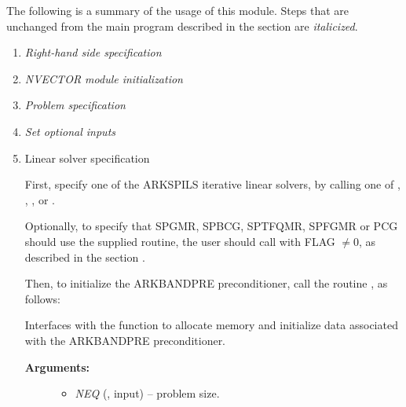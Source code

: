 \documentclass[letterpaper,10pt,english]{sphinxmanual}
\begin{document}
The following is a summary of the usage of this module.  Steps that
are unchanged from the main program described in the section
{\hyperref[f_interface/Usage:finterface-usage]{\emph{}}} are \emph{italicized}.
\begin{enumerate}
\item {} 
\emph{Right-hand side specification}

\item {} 
\emph{NVECTOR module initialization}

\item {} 
\emph{Problem specification}

\item {} 
\emph{Set optional inputs}

\item {} 
Linear solver specification

First, specify one of the ARKSPILS iterative linear solvers, by
calling one of {\hyperref[f_interface/Usage:f/_/FARKSPGMR]{\emph{}}}, {\hyperref[f_interface/Usage:f/_/FARKSPBCG]{\emph{}}},
{\hyperref[f_interface/Usage:f/_/FARKSPTFQMR]{\emph{}}}, {\hyperref[f_interface/Usage:f/_/FARKSPFGMR]{\emph{}}} or
{\hyperref[f_interface/Usage:f/_/FARKPCG]{\emph{}}}.

Optionally, to specify that SPGMR, SPBCG, SPTFQMR, SPFGMR or PCG
should use the supplied {\hyperref[f_interface/Usage:f/_/FARKJTIMES]{\emph{}}} routine, the user
should call {\hyperref[f_interface/Usage:f/_/FARKSPILSSETJAC]{\emph{}}} with FLAG \(\ne 0\),
as described in the section {\hyperref[f_interface/Usage:finterface-spilsusersupplied]{\emph{}}}.

Then, to initialize the ARKBANDPRE preconditioner, call the
routine {\hyperref[f_interface/Preconditioning:f/_/FARKBPINIT]{\emph{}}}, as follows:

\begin{fulllineitems}
\label{f_interface/Preconditioning:f/_/FARKBPINIT}
Interfaces with the {\hyperref[c_interface/Preconditioners:c.ARKBandPrecInit]{\emph{}}}
function to allocate memory and initialize data associated
with the ARKBANDPRE preconditioner.
\begin{description}
\item[{\textbf{Arguments:}}] \leavevmode\begin{itemize}
\item {} 
\emph{NEQ} (, input) -- problem size.


\end{itemize}
\end{description}
\end{fulllineitems}
\end{enumerate}
\end{document}
